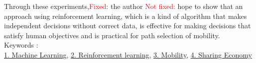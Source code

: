 Through these experiments,\textcolor{red}{Fixed: } the author \textcolor{red}{Not fixed: }hope to show that an approach using reinforcement learning, which is a kind of algorithm that makes independent decisions without correct data, is effective for making decisions that satisfy human objectives and is practical for path selection of mobility.
~ \\
Keywords : \\
\underline{1. Machine Learning},
\underline{2. Reinforcement learning},
\underline{3. Mobility},
\underline{4. Sharing Economy}
\begin{flushright}
\edept \\
\eauthor
\end{flushright}
